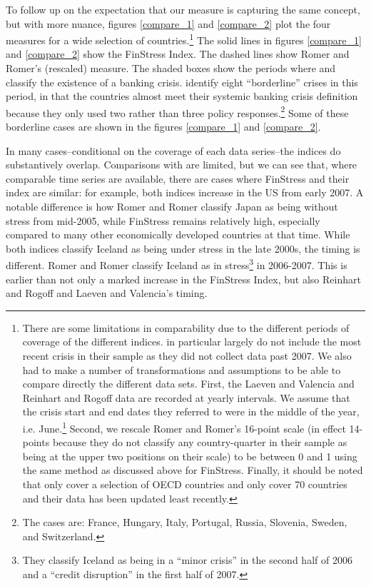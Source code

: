 \documentclass[]{article}
\begin{document}
To follow up on the expectation that our measure is capturing the same concept, but with more nuance, figures \ref{compare_1} and \ref{compare_2} plot the four measures for a wide selection of countries.\footnote{There are some limitations in comparability due to the different periods of coverage of the different indices. \cite{Romer2015} in particular largely do not include the most recent crisis in their sample as they did not collect data past 2007. We also had to make a number of transformations and assumptions to be able to  compare directly the different data sets. First, the Laeven and Valencia and Reinhart and Rogoff data are recorded at yearly intervals. We assume that the crisis start and end dates they referred to were in the middle of the year, i.e. June.\footnote{In the period covered in figures \ref{compare_1} and \ref{compare_2} this improves their fit with events, as many of the 2008 crises became especially apparent after Lehman Brothers collapse in September 2008.} Second, we rescale Romer and Romer's 16-point scale (in effect 14-points because they do not classify any country-quarter in their sample as being at the upper two positions on their scale) to be between 0 and 1 using the same method as discussed above for FinStress. Finally, it should be noted that \cite{Romer2015} only cover a selection of OECD countries and \cite{Reinhart2009} only cover 70 countries and their data has been updated least recently.} The solid lines in figures \ref{compare_1} and \ref{compare_2} show the FinStress Index. The dashed lines show Romer and Romer's (rescaled) measure. The shaded boxes show the periods where \cite{laeven2013} and \cite{Reinhart2009} classify the existence of a banking crisis. \cite{laeven2013} identify eight ``borderline'' crises in this period, in that the countries almost meet their systemic banking crisis definition because they only used two rather than three policy responses.\footnote{The cases are: France, Hungary, Italy, Portugal, Russia, Slovenia, Sweden, and Switzerland.} Some of these borderline cases are shown in the figures \ref{compare_1} and \ref{compare_2}.

In many cases--conditional on the coverage of each data series--the indices do substantively overlap. Comparisons with \cite{Romer2015} are limited, but we can see that, where comparable time series are available, there are cases where FinStress and their index are similar: for example, both indices increase in the US from early 2007. A notable difference is how Romer and Romer classify Japan as being without stress from mid-2005, while FinStress remains relatively high, especially compared to many other economically developed countries at that time. While both indices classify Iceland as being under stress in the late 2000s, the timing is different. Romer and Romer classify Iceland as in stress\footnote{They classify Iceland as being in a ``minor crisis'' in the second half of 2006 and a ``credit  disruption'' in the first half of 2007.} in 2006-2007. This is earlier than not only a marked increase in the FinStress Index, but also Reinhart and Rogoff and Laeven and Valencia's timing.
\end{document}
